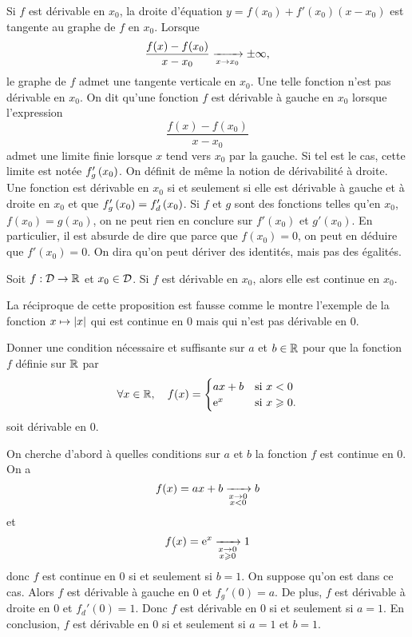 \documentclass{magnolia}
\begin{document}
\begin{remarques}
\remarque Si $f$ est dérivable en $x_0$, la droite d'équation
  $y=f(x_0)+f'(x_0)(x-x_0)$
  est tangente au graphe de $f$ en $x_0$.
\remarque Lorsque
  \[\frac{f(x)-f(x_0)}{x-x_0}\xrightarrow[x\rightarrow x_0]{}\pm\infty,\]
  le graphe de $f$ admet une tangente verticale en $x_0$. Une telle fonction n'est pas dérivable en $x_0$.
\remarque On dit qu'une fonction $f$ est dérivable à gauche en $x_0$ lorsque
  l'expression
  \[\frac{f(x)-f(x_0)}{x-x_0}\]
  admet une limite finie lorsque $x$ tend vers $x_0$ par la gauche. Si tel est le
  cas, cette limite est notée $f_g'\left(x_0\right)$. On définit de même la notion de
  dérivabilité à droite. Une fonction est dérivable en $x_0$ si et seulement si
  elle est dérivable à gauche et à droite en $x_0$ et que
  $f_g'\left(x_0\right)=f_d'\left(x_0\right)$.
\remarque Si $f$ et $g$ sont des fonctions telles qu'en $x_0$, $f(x_0)=g(x_0)$, on ne peut rien en conclure sur
  $f'(x_0)$ et $g'(x_0)$. En particulier, il est absurde de dire que parce que
  $f(x_0)=0$, on peut en déduire que $f'(x_0)=0$.
  On dira qu'on peut dériver des identités, mais pas des égalités.
\end{remarques}

\begin{proposition}[utile=-3]
Soit $f:\mathcal{D}\to\mathbb{R}$ et $x_0\in\mathcal{D}$. Si $f$ est dérivable en $x_0$,
alors elle est continue en $x_0$.
\end{proposition}

\begin{remarqueUnique}
\remarque La réciproque de cette proposition est fausse comme le montre
  l'exemple de la fonction $x\mapsto\left|x\right|$ qui est continue en 0 mais
  qui n'est pas dérivable en 0.
\end{remarqueUnique}

\begin{exoUnique}
\exo Donner une condition nécessaire et suffisante sur $a$ et $b\in\mathbb{R}$
  pour que la fonction $f$ définie sur $\mathbb{R}$ par
  \[\forall x\in\mathbb{R} ,\quad f(x)=
    \begin{cases}
    ax+b & \text{si $x<0$}\\
    {\rm e}^x & \text{si $x\geqslant 0$}.
    \end{cases}\]
  soit dérivable en 0.
  \begin{sol}
On cherche d'abord à quelles conditions sur $a$ et $b$ la fonction $f$ est continue en 0. On a
\[f(x)=ax+b\xrightarrow[ \substack{x\rightarrow 0 \\ x<0}]{}b\]
et
\[f(x)={\rm e}^x\xrightarrow[ \substack{x\rightarrow 0 \\ x\geqslant 0}]{}1\]
donc $f$ est continue en 0 si et seulement si $b=1$. On suppose qu'on est dans ce cas. Alors $f$ est dérivable à gauche en 0 et $f_g'(0)=a$. De plus, $f$ est dérivable à droite en 0 et $f_d'(0)=1$. Donc $f$ est dérivable en 0 si et seulement si $a=1$. En conclusion, $f$ est dérivable en 0 si et seulement si $a=1$ et $b=1$. 
  \end{sol}
\end{exoUnique}
\end{document}
